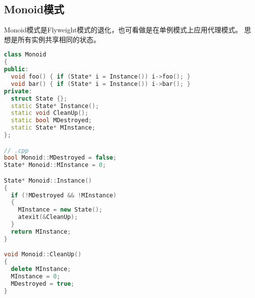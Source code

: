 \subsection{Monoid模式}
Monoid模式是Flyweight模式的退化，也可看做是在单例模式上应用代理模式。
思想是所有实例共享相同的状态。
\begin{lstlisting}[language=C++] 
class Monoid
{
public:
  void foo() { if (State* i = Instance()) i->foo(); }
  void bar() { if (State* i = Instance()) i->bar(); }
private:
  struct State {};
  static State* Instance();
  static void CleanUp();
  static bool MDestroyed;
  static State* MInstance;
};

// .cpp
bool Monoid::MDestroyed = false;
State* Monoid::MInstance = 0;

State* Monoid::Instance()
{
  if (!MDestroyed && !MInstance)
  {
    MInstance = new State();
    atexit(&CleanUp);
  }
  return MInstance;
}

void Monoid::CleanUp()
{
  delete MInstance;
  MInstance = 0;
  MDestroyed = true;
}
\end{lstlisting}


